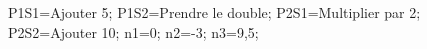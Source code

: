 \documentclass[exercice]{thedocument}%
\begin{document}
%
    \>P1S1=Ajouter 5;%
    \>P1S2=Prendre le double;%
    \>P2S1=Multiplier par 2;%
    \>P2S2=Ajouter 10;%
    \>n1=0;%
    \>n2=-3;%
    \>n3=9,5;%
\end{document}
